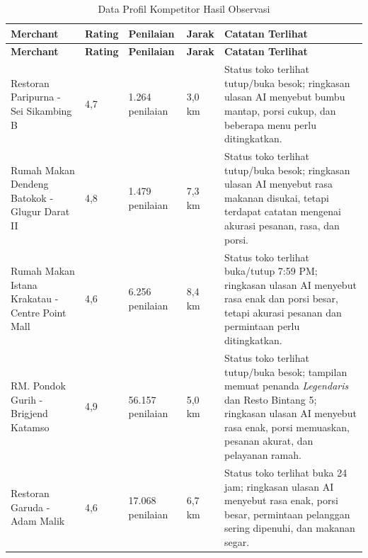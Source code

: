 \begingroup
\footnotesize
\begin{xltabular}{\textwidth}{|Z{3.2cm}|C{1.4cm}|C{2.0cm}|C{1.4cm}|Y|}
\caption{Data Profil Kompetitor Hasil Observasi}
\label{tab:profil-kompetitor-terlihat-grabfood-20260619} \\
        \toprule
        \textbf{Merchant} & \textbf{Rating} & \textbf{Penilaian} & \textbf{Jarak} & \textbf{Catatan Terlihat} \\ \hline
        \midrule
\endfirsthead
{}
        \toprule
        \textbf{Merchant} & \textbf{Rating} & \textbf{Penilaian} & \textbf{Jarak} & \textbf{Catatan Terlihat} \\ \hline
        \midrule
\endhead
{}
\endfoot
        \bottomrule
        \endlastfoot
        Restoran Paripurna - Sei Sikambing B & 4,7 & 1.264 penilaian & 3,0 km & Status toko terlihat tutup/buka besok; ringkasan ulasan AI menyebut bumbu mantap, porsi cukup, dan beberapa menu perlu ditingkatkan. \\ \hline
        Rumah Makan Dendeng Batokok - Glugur Darat II & 4,8 & 1.479 penilaian & 7,3 km & Status toko terlihat tutup/buka besok; ringkasan ulasan AI menyebut rasa makanan disukai, tetapi terdapat catatan mengenai akurasi pesanan, rasa, dan porsi. \\ \hline
        Rumah Makan Istana Krakatau - Centre Point Mall & 4,6 & 6.256 penilaian & 8,4 km & Status toko terlihat buka/tutup 7:59 PM; ringkasan ulasan AI menyebut rasa enak dan porsi besar, tetapi akurasi pesanan dan permintaan perlu ditingkatkan. \\ \hline
        RM. Pondok Gurih - Brigjend Katamso & 4,9 & 56.157 penilaian & 5,0 km & Status toko terlihat tutup/buka besok; tampilan memuat penanda \textit{Legendaris} dan Resto Bintang 5; ringkasan ulasan AI menyebut rasa enak, porsi memuaskan, pesanan akurat, dan pelayanan ramah. \\ \hline
        Restoran Garuda - Adam Malik & 4,6 & 17.068 penilaian & 6,7 km & Status toko terlihat buka 24 jam; ringkasan ulasan AI menyebut rasa enak, porsi besar, permintaan pelanggan sering dipenuhi, dan makanan segar. \\ \hline
        \bottomrule
    
\end{xltabular}
\endgroup

